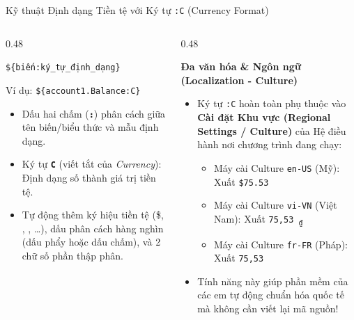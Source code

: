 \documentclass[aspectratio=169, 10pt]{beamer}
\begin{document}
\begin{frame}{Kỹ thuật Định dạng Tiền tệ với Ký tự \texttt{:C} (Currency Format)}
  \begin{columns}[T]
    \begin{column}{0.48\textwidth}
      \begin{tcolorbox}[colback=UniLightBlue!40,colframe=UniNavy,title=\textbf{Cú pháp Định dạng Chuỗi Nội suy},fonttitle=\small\bfseries]
        \begin{center}
          \Large \texttt{\$\{biến:ký\_tự\_định\_dạng\}}
        \end{center}
        \small Ví dụ:
        \texttt{\$\{account1.Balance:C\}}
        \begin{itemize}\small
          \item Dấu hai chấm (\textbf{\texttt{:}}) phân cách giữa tên biến/biểu thức và mẫu định dạng.
          \item Ký tự \textbf{\texttt{C}} (viết tắt của \textit{Currency}): Định dạng số thành giá trị tiền tệ.
          \item Tự động thêm ký hiệu tiền tệ (\$, \texteuro, \textyen, \dots), dấu phân cách hàng nghìn (dấu phẩy hoặc dấu chấm), và 2 chữ số phần thập phân.
        \end{itemize}
      \end{tcolorbox}
    \end{column}

    \begin{column}{0.48\textwidth}
      \begin{exampleblock}{\textbf{Đa văn hóa \& Ngôn ngữ (Localization - Culture)}}
        \begin{itemize}\small
          \item Ký tự \texttt{:C} hoàn toàn phụ thuộc vào \textbf{Cài đặt Khu vực (Regional Settings / Culture)} của Hệ điều hành nơi chương trình đang chạy:
          \begin{itemize}\footnotesize
            \item Máy cài Culture \texttt{en-US} (Mỹ): Xuất \texttt{\$75.53}
            \item Máy cài Culture \texttt{vi-VN} (Việt Nam): Xuất \texttt{75,53 \textsubscript{₫}}
            \item Máy cài Culture \texttt{fr-FR} (Pháp): Xuất \texttt{75,53 \texteuro}
          \end{itemize}
          \item Tính năng này giúp phần mềm của các em tự động chuẩn hóa quốc tế mà không cần viết lại mã nguồn!
        \end{itemize}
      \end{exampleblock}
    \end{column}
  \end{columns}
\end{frame}
\end{document}
